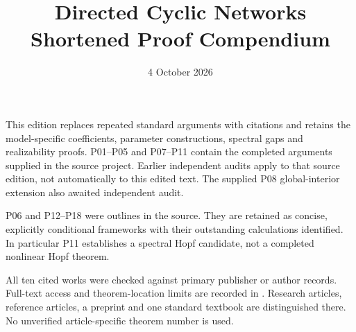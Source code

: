 \documentclass[11pt]{article}
\title{Directed Cyclic Networks\\Shortened Proof Compendium}
\author{}
\date{4 October 2026}
\begin{document}
\maketitle
\noindent This edition replaces repeated standard arguments with citations
and retains the model-specific coefficients, parameter constructions,
spectral gaps and realizability proofs. P01--P05 and P07--P11 contain the
completed arguments supplied in the source project. Earlier independent
audits apply to that source edition, not automatically to this edited text.
The supplied P08 global-interior extension also awaited independent audit.

\medskip\noindent P06 and P12--P18 were outlines in the source.
They are retained as concise, explicitly conditional frameworks with
their outstanding calculations identified. In particular P11 establishes
a spectral Hopf candidate, not a completed nonlinear Hopf theorem.

\medskip\noindent All ten cited works were checked against primary
publisher or author records. Full-text access and theorem-location limits
are recorded in . Research articles,
reference articles, a preprint and one standard textbook are distinguished
there. No unverified article-specific theorem number is used.
\clearpage
\tableofcontents
\clearpage







































\clearpage


\end{document}
